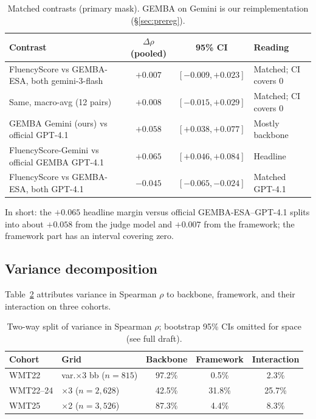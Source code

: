\documentclass[11pt]{article}
\newcommand{\FS}{FluencyScore}
\begin{document}
\begin{table}[t]
\centering
\scriptsize
\caption{Matched contrasts (primary mask). GEMBA on Gemini is our reimplementation (\S\ref{sec:prereg}).}
\label{tab:4c}
\begin{tabularx}{\columnwidth}{@{}>{\raggedright\arraybackslash}Xcc>{\raggedright\arraybackslash}X@{}}
\toprule
Contrast & $\Delta\rho$ (pooled) & 95\% CI & Reading \\
\midrule
\FS{} vs GEMBA-ESA, both gemini-3-flash & $+0.007$ & $[-0.009,+0.023]$ & Matched; CI covers 0 \\
Same, macro-avg (12 pairs) & $+0.008$ & $[-0.015,+0.029]$ & Matched; CI covers 0 \\
GEMBA Gemini (ours) vs official GPT-4.1 & $+0.058$ & $[+0.038,+0.077]$ & Mostly backbone \\
\FS{}-Gemini vs official GEMBA GPT-4.1 & $+0.065$ & $[+0.046,+0.084]$ & Headline \\
\FS{} vs GEMBA-ESA, both GPT-4.1 & $-0.045$ & $[-0.065,-0.024]$ & Matched GPT-4.1 \\
\bottomrule
\end{tabularx}

\end{table}


In short: the ${+}0.065$ headline margin versus official GEMBA-ESA--GPT-4.1
splits into about ${+}0.058$ from the judge model and ${+}0.007$ from the
framework; the framework part has an interval covering zero.

\subsection{Variance decomposition}
Table~\ref{tab:7d} attributes variance in Spearman $\rho$ to backbone,
framework, and their interaction on three cohorts.

\begin{table}[t]
\centering
\scriptsize
\setlength{\tabcolsep}{2pt}

\caption{Two-way split of variance in Spearman $\rho$; bootstrap 95\% CIs omitted for space (see full draft).}
\label{tab:7d}
\begin{tabularx}{\columnwidth}{>{\raggedright\arraybackslash}X>{\raggedright\arraybackslash}Xccc}
\toprule
Cohort & Grid & Backbone & Framework & Interaction \\
\midrule
WMT22 & 3 var.$\times$3 bb ($n{=}815$) & 97.2\% & 0.5\% & 2.3\% \\
WMT22--24 & 3$\times$3 ($n{=}2{,}628$) & 42.5\% & 31.8\% & 25.7\% \\
WMT25 & 2$\times$2 ($n{=}3{,}526$) & 87.3\% & 4.4\% & 8.3\% \\
\bottomrule
\end{tabularx}

\end{table}
\end{document}
